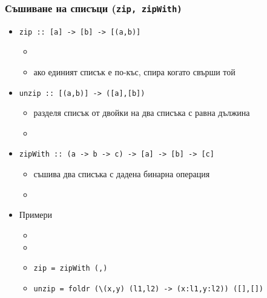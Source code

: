 \documentclass{beamer}
\begin{document}
\begin{frame}
  \frametitle{Съшиване на списъци (\tt{zip}, \tt{zipWith})}
  \begin{itemize}[<+->]
  \item \tt{zip :: [a] -> [b] -> [(a,b)]}
    \begin{itemize}
    \item {}
    \item ако единият списък е по-къс, спира когато свърши той
  \end{itemize}
  \item \tt{unzip :: [(a,b)] -> ([a],[b])}
    \begin{itemize}
    \item разделя списък от двойки на два списъка с равна
      дължина
    \item {}
    \end{itemize}
  \item \tt{zipWith :: (a -> b -> c) -> [a] -> [b] -> [c]}
    \begin{itemize}
    \item съшива два списъка с дадена бинарна операция
    \item {}
    \end{itemize}
  \item Примери
    \begin{itemize}
    \item {}
    \item {}
    \item \tt{zip = zipWith (,)}
    \item \tt{unzip = foldr (\textbackslash(x,y) (l1,l2) -> (x:l1,y:l2)) ([],[])}
    \end{itemize}
  \end{itemize}
\end{frame}
\end{document}
